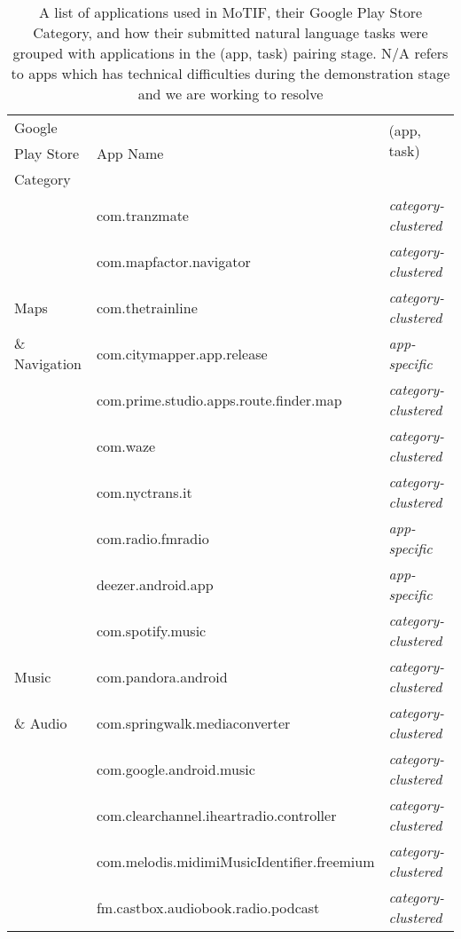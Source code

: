 \begin{table}
    \centering
        \caption{A list of applications used in MoTIF, their Google Play Store Category, and how their submitted natural language tasks were grouped with applications in the (app, task) pairing stage. N/A refers to apps which has technical difficulties during the demonstration stage and we are working to resolve}
    \begin{tabular}{|l|l|l|}
    \hline
         Google  & \multirow{3}{*}{App Name} & \multirow{2}{*}{(app, task)}  \\
         Play Store & & \multirow{2}{*}{Pairing Method} \\
         Category &  &  \\
         \hline
        & com.tranzmate & \textit{category-clustered} \\ \cline{2-3}
         & com.mapfactor.navigator& \textit{category-clustered}\\ \cline{2-3}
        Maps & com.thetrainline&\textit{category-clustered} \\ \cline{2-3}
       \& Navigation  & com.citymapper.app.release& \textit{app-specific}\\ \cline{2-3} &  com.prime.studio.apps.route.finder.map& \textit{category-clustered}\\ \cline{2-3}
         & com.waze& \textit{category-clustered}\\ \cline{2-3}
        & com.nyctrans.it &\textit{category-clustered} \\ \hline
          & com.radio.fmradio & \textit{app-specific}\\ \cline{2-3}
        & deezer.android.app&  \textit{app-specific}\\ \cline{2-3}
         & com.spotify.music& \textit{category-clustered}\\ \cline{2-3}
        Music & com.pandora.android& \textit{category-clustered}\\ \cline{2-3}
       \& Audio & com.springwalk.mediaconverter& \textit{category-clustered}\\ \cline{2-3} 
         & com.google.android.music& \textit{category-clustered}\\ \cline{2-3}
         & com.clearchannel.iheartradio.controller& \textit{category-clustered}\\ \cline{2-3}
        & com.melodis.midimiMusicIdentifier.freemium & \textit{category-clustered}\\
         \hline
         &  fm.castbox.audiobook.radio.podcast& \textit{category-clustered} \\ \cline{2-3}

\end{tabular}
\end{table}
